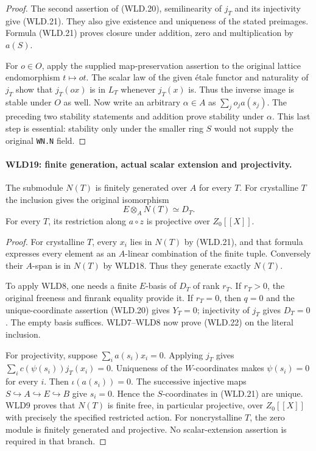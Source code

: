 \documentclass[11pt,a4paper]{article}
\numberwithin{equation}{section}
\theoremstyle{remark}\newtheorem{remark}[theorem]{Remark}
\begin{document}
\begin{proof}
The second assertion of (WLD.20), semilinearity of $j_T$ and its
injectivity give (WLD.21). They also give existence and uniqueness
of the stated preimages. Formula (WLD.21) proves closure under
addition, zero and multiplication by $a(S)$.

For $o\in O$, apply the supplied map-preservation assertion to the
original lattice endomorphism $t\mapsto ot$. The scalar law of
the given \'etale functor and naturality of $j_T$ show that
$j_T(ox)$ is in $L_T$ whenever $j_T(x)$ is. Thus the inverse
image is stable under $O$ as well. Now write an arbitrary
$\alpha\in A$ as $\sum_j o_ja(s_j)$. The preceding two stability
statements and addition prove stability under $\alpha$.
This last step is essential: stability only under the smaller
ring $S$ would not supply the original \texttt{WN.\allowbreak N} field.
\end{proof}

\paragraph{WLD19: finite generation, actual scalar extension and projectivity.}
\label{claim:WLD19}
The submodule $N(T)$ is finitely generated over $A$ for every $T$.
For crystalline $T$ the inclusion gives the original isomorphism
\[
                        E\otimes_A N(T)\simeq D_T.         \tag{WLD.22}
\]
For every $T$, its restriction along $a\circ z$ is projective
over $Z_0[[X]]$.

\begin{proof}
For crystalline $T$, every $x_i$ lies in $N(T)$ by (WLD.21),
and that formula expresses every element as an $A$-linear
combination of the finite tuple. Conversely their $A$-span is
in $N(T)$ by WLD18. Thus they generate exactly $N(T)$.

To apply WLD8, one needs a finite $E$-basis of $D_T$ of rank $r_T$.
If $r_T>0$, the original freeness and finrank equality provide it.
If $r_T=0$, then $q=0$ and the unique-coordinate assertion
(WLD.20) gives $Y_T=0$; injectivity of $j_T$ gives $D_T=0$.
The empty basis suffices. WLD7--WLD8 now prove (WLD.22) on
the literal inclusion.

For projectivity, suppose $\sum_i a(s_i)x_i=0$. Applying $j_T$
gives $\sum_i c(\psi(s_i))j_T(x_i)=0$. Uniqueness of the
$W$-coordinates makes $\psi(s_i)=0$ for every $i$.
Then $\iota(a(s_i))=0$. The successive injective maps
$S\hookrightarrow A\hookrightarrow E\hookrightarrow B$
give $s_i=0$. Hence the $S$-coordinates in (WLD.21) are unique.
WLD9 proves that $N(T)$ is finite free, in particular projective,
over $Z_0[[X]]$ with precisely the specified restricted action.
For noncrystalline $T$, the zero module is finitely generated
and projective. No scalar-extension assertion is required in
that branch.
\end{proof}
\end{document}
